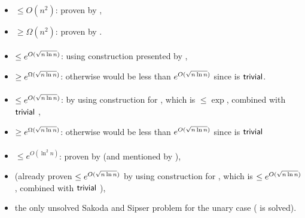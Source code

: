 \paragraph{\ONFA{}\tto\TDFA}\label{cost:1NFAto2DFAu}
\begin{itemize}
	\item $\le O(n^2)$: proven by ,
	\item $\ge \Omega(n^2)$: proven by .
\end{itemize}
\paragraph{\TNFA{}\tto\ODFA}\label{cost:2NFAto1DFAu}
\begin{itemize}
	\item $\le e^{O(\sqrt{n\ln n})}$: using construction presented by ,
	\item $\ge e^{\Omega(\sqrt{n\ln n})}$: otherwise \hyperref[cost:2DFAto1DFAu]{\TDFA{}\tto\ODFA} would be less than $e^{O(\sqrt{n\ln n})}$ since \TDFA{}\tto\TNFA is $\mathsf{trivial}$.
\end{itemize}
\paragraph{\TNFA{}\tto\ONFA}
\begin{itemize}
	\item $\le e^{O(\sqrt{n\ln n})}$: by using construction for \hyperref[cost:2NFAto1DFAu]{\TNFA{}\tto\ODFA}, which is $\le\exp$, combined with $\mathsf{trivial}$ \ODFA{}\tto\ONFA,
	\item $\ge e^{\Omega(\sqrt{n\ln n})}$: otherwise \hyperref[cost:2DFAto1NFAu]{\TDFA{}\tto\ONFA} would be less than $e^{O(\sqrt{n\ln n})}$ since \TDFA{}\tto\TNFA is $\mathsf{trivial}$
\end{itemize}
\paragraph{\TNFA{}\tto\TDFA}\label{cost:2NFAto2DFAu}
\begin{itemize}
	\item $\le e^{O(\ln^2n)}$: proven by  (and mentioned by ),
	\item (already proven $\le e^{O(\sqrt{n\ln n})}$ by using construction for \hyperref[cost:2NFAto1DFAu]{\TNFA{}\tto\ODFA}, which is $\le e^{O(\sqrt{n\ln n})}$, combined with $\mathsf{trivial}$ \ODFA{}\tto\TDFA),
	\item the only unsolved Sakoda and Sipser problem for the unary case (\hyperref[cost:1NFAto2DFAu]{\ONFA{}\tto\TDFA} is solved).
\end{itemize}



